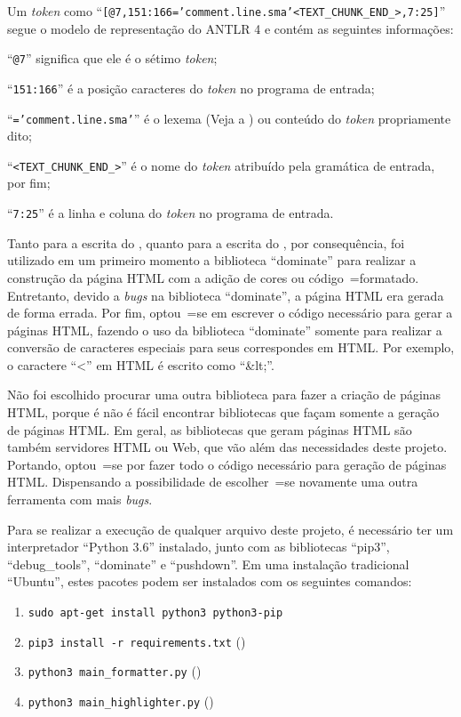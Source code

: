 Um \textit{token} como ``\texttt{[@7,151:166='comment.line.sma'<TEXT_CHUNK_END_>,7:25]}'' segue o modelo de representação do ANTLR 4 \cite{antlrBookTerrentParr} e
contém as seguintes informações:
\begin{inparaenum}[1)]
\item ``\texttt{@7}'' significa que ele é o sétimo \textit{token};
\item ``\texttt{151:166}'' é a posição caracteres do \textit{token} no programa de entrada;
\item ``\texttt{='comment.line.sma'}'' é o lexema (Veja a ) ou
conteúdo do \textit{token} propriamente dito;
\item ``\texttt{<TEXT_CHUNK_END_>}'' é o nome do \textit{token} atribuído pela gramática de entrada,
por fim;
\item ``\texttt{7:25}'' é a linha e
coluna do \textit{token} no programa de entrada.
\end{inparaenum}%

Tanto para a escrita do ,
quanto para a escrita do ,
por consequência,
foi utilizado em um primeiro momento a biblioteca ``dominate'' para realizar a construção da página HTML com a adição de cores ou
código~=formatado. Entretanto,
devido a \textit{bugs} na biblioteca ``dominate'',
a página HTML era gerada de forma errada.
Por fim,
optou~=se em escrever o código necessário para gerar a páginas HTML,
fazendo o uso da biblioteca ``dominate'' somente para realizar a conversão de caracteres especiais para seus correspondes em HTML.
Por exemplo,
o caractere ``<'' em HTML é escrito como ``\&lt;''.

Não foi escolhido procurar uma outra biblioteca para fazer a criação de páginas HTML,
porque é não é fácil encontrar bibliotecas que façam somente a geração de páginas HTML.
Em geral,
as bibliotecas que geram páginas HTML são também servidores HTML ou
Web,
que vão além das necessidades deste projeto.
Portando,
optou~=se por fazer todo o código necessário para geração de páginas HTML.
Dispensando a possibilidade de escolher~=se novamente uma outra ferramenta com mais \textit{bugs}.

Para se realizar a execução de qualquer arquivo deste projeto,
é necessário ter um interpretador ``Python 3.6'' instalado,
junto com as bibliotecas ``pip3'',
``debug\_tools'', ``dominate'' e
``pushdown''.
Em uma instalação tradicional ``Ubuntu'',
estes pacotes podem ser instalados com os seguintes comandos:
\begin{enumerate}[1)]
\item \texttt{sudo apt-get install python3 python3-pip}
\item \texttt{pip3 install -r requirements.txt} ()
\item \texttt{python3 main_formatter.py} ()
\item \texttt{python3 main_highlighter.py} ()
\end{enumerate}

